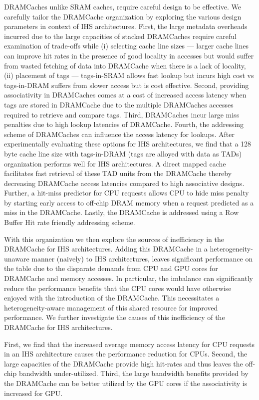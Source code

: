 \documentclass[12pt,a4paper]{report}
\begin{document}
\par DRAMCaches unlike SRAM caches, require careful design to be effective. We carefully tailor the DRAMCache organization by exploring the various design parameters in context of IHS architectures. First, the large metadata overheads incurred due to the large capacities of stacked DRAMCaches require careful examination of trade-offs while (i) selecting cache line sizes --- larger cache lines can improve hit rates in the presence of good locality in accesses but would suffer from wasted fetching of data into DRAMCache when there is a lack of locality, (ii) placement of tags --- tags-in-SRAM allows fast lookup but incurs high cost vs tags-in-DRAM suffers from slower access but is cost effective. Second, providing associativity in DRAMCaches comes at a cost of increased access latency when tags are stored in DRAMCache due to the multiple DRAMCaches accesses required to retrieve and compare tags. Third, DRAMCaches incur large miss penalties due to high lookup latencies of DRAMCache. Fourth, the addressing scheme of DRAMCaches can influence the access latency for lookups. 
After experimentally evaluating these options for IHS architectures, we find that a 128 byte cache line size with tags-in-DRAM (tags are alloyed with data as TADs) organization performs well for IHS architectures. A direct mapped cache facilitates fast retrieval of these TAD units from the DRAMCache thereby decreasing DRAMCache access latencies compared to high associative designs. Further, a hit-miss predictor for CPU requests allows CPU to hide miss penalty by starting early access to off-chip DRAM memory when a request predicted as a miss in the DRAMCache. Lastly, the DRAMCache is addressed using a Row Buffer Hit rate friendly addressing scheme.
\par With this organization we then explore the sources of inefficiency in the DRAMCache for IHS architectures. Adding this DRAMCache in a heterogeneity-unaware manner (naively) to IHS architectures, leaves significant performance on the table due to the disparate demands from CPU and GPU cores for DRAMCache and memory accesses.
In particular, the imbalance can significantly reduce the performance benefits that the CPU cores would have otherwise enjoyed with the introduction of the DRAMCache. This necessitates a heterogeneity-aware management of this shared resource for improved performance. We further investigate the causes of this inefficiency of the DRAMCache for IHS architectures.

\par First, we find that the increased average memory access latency for CPU requests in an IHS architecture causes the performance reduction for CPUs. Second, the large capacities of the DRAMCache provide high hit-rates and thus leaves the off-chip bandwidth under-utilized. Third, the large bandwidth benefits provided by the DRAMCache can be better utilized by the GPU cores if the associativity is increased for GPU.
\end{document}
